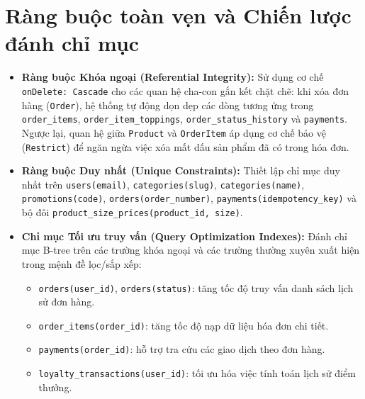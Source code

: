 \section{Ràng buộc toàn vẹn và Chiến lược đánh chỉ mục}
\begin{itemize}
    \item \textbf{Ràng buộc Khóa ngoại (Referential Integrity):} Sử dụng cơ chế \texttt{onDelete: Cascade} cho các quan hệ cha-con gắn kết chặt chẽ: khi xóa đơn hàng (\texttt{Order}), hệ thống tự động dọn dẹp các dòng tương ứng trong \texttt{order\_items}, \texttt{order\_item\_toppings}, \texttt{order\_status\_history} và \texttt{payments}. Ngược lại, quan hệ giữa \texttt{Product} và \texttt{OrderItem} áp dụng cơ chế bảo vệ (\texttt{Restrict}) để ngăn ngừa việc xóa mất dấu sản phẩm đã có trong hóa đơn.
    \item \textbf{Ràng buộc Duy nhất (Unique Constraints):} Thiết lập chỉ mục duy nhất trên \texttt{users(email)}, \texttt{categories(slug)}, \texttt{categories(name)}, \texttt{promotions(code)}, \texttt{orders(order\_number)}, \texttt{payments(idempotency\_key)} và bộ đôi \texttt{product\_size\_prices(product\_id, size)}.
    \item \textbf{Chỉ mục Tối ưu truy vấn (Query Optimization Indexes):} Đánh chỉ mục B-tree trên các trường khóa ngoại và các trường thường xuyên xuất hiện trong mệnh đề lọc/sắp xếp:
    \begin{itemize}
        \item \texttt{orders(user\_id)}, \texttt{orders(status)}: tăng tốc độ truy vấn danh sách lịch sử đơn hàng.
        \item \texttt{order\_items(order\_id)}: tăng tốc độ nạp dữ liệu hóa đơn chi tiết.
        \item \texttt{payments(order\_id)}: hỗ trợ tra cứu các giao dịch theo đơn hàng.
        \item \texttt{loyalty\_transactions(user\_id)}: tối ưu hóa việc tính toán lịch sử điểm thưởng.
    \end{itemize}
\end{itemize}

